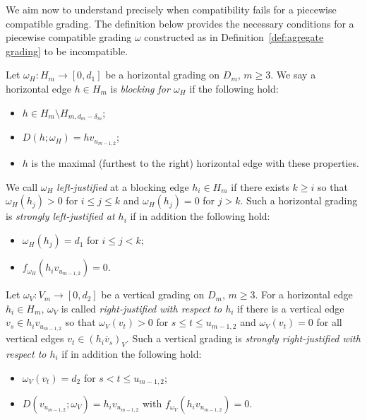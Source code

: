 \documentclass[ALCO,ThmDefs,Unicode,epreuves]{cedram}
\begin{document}
We aim now to understand precisely when compatibility fails for a piecewise compatible grading. 
The definition below provides the necessary conditions for a piecewise compatible grading $\omega$ constructed as in Definition~\ref{def:agregate grading} to be incompatible.
\begin{definition}
 \label{def:blocking and justification}
 Let $\omega_H:H_m\to[0,d_1]$ be a horizontal grading on $D_m$, $m\ge3$. We say a horizontal edge $h\in H_m$ is \emph{blocking for $\omega_H$} if the following hold:
 \begin{itemize}
 \item $h\in H_m\setminus H_{m,d_m-\delta_m}$;
 \item $D(h;\omega_H)=hv_{u_{m-1,2}}$;
 \item $h$ is the maximal (\ie furthest to the right) horizontal edge with these properties.
 \end{itemize}
 We call $\omega_H$ \emph{left-justified} at a blocking edge $h_i\in H_m$ if there exists $k\ge i$ so that $\omega_H(h_j)>0$ for $i\le j\le k$ and $\omega_H(h_j)=0$ for $j>k$. 
 Such a horizontal grading is \emph{strongly left-justified at $h_i$} if in addition the following hold:
 \begin{itemize}
 \item $\omega_H(h_j)=d_1$ for $i\le j<k$;
 \item $f_{\omega_H}(h_iv_{u_{m-1,2}})=0$.
 \end{itemize}
 Let $\omega_V:V_m\to[0,d_2]$ be a vertical grading on $D_m$, $m\ge3$. 
 For a horizontal edge $h_i\in H_m$, $\omega_V$ is called \emph{right-justified with respect to $h_i$} if there is a vertical edge $v_s\in h_iv_{u_{m-1,2}}$ so that $\omega_V(v_t)>0$ for $s\le t\le u_{m-1,2}$ and $\omega_V(v_t)=0$ for all vertical edges $v_t\in(h_i\overline{v}_s)_V$. 
 Such a vertical grading is \emph{strongly right-justified with respect to $h_i$} if in addition the following hold:
 \begin{itemize}
 \item $\omega_V(v_t)=d_2$ for $s<t\le u_{m-1,2}$;
 \item $D(v_{u_{m-1,2}};\omega_V)=h_iv_{u_{m-1,2}}$ with $f_{\omega_V}(h_iv_{u_{m-1,2}})=0$.
 \end{itemize}
\end{definition}
\end{document}
